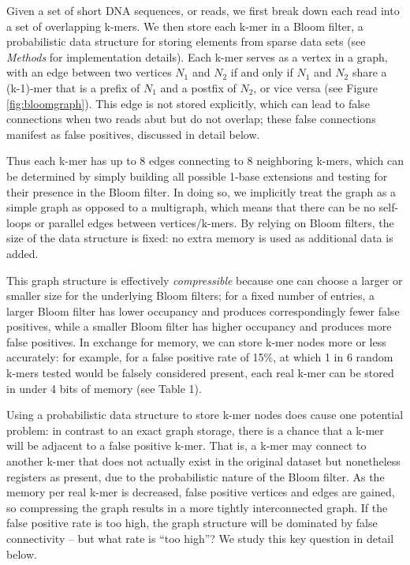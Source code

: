 \documentclass[draft]{pnastwo}
\begin{document}
\begin{article}
Given a set of short DNA sequences, or reads, we first break down each
read into a set of overlapping k-mers.  We then store each k-mer in a
Bloom filter, a probabilistic data structure for storing elements from
sparse data sets (see \emph{Methods} for implementation details).
Each k-mer serves as a vertex in a graph, with an edge between two
vertices $N_1$ and $N_2$ if and only if $N_1$ and $N_2$ share a
(k-1)-mer that is a prefix of $N_1$ and a postfix of $N_2$, or vice
versa (see Figure \ref{fig:bloomgraph}).  This edge is not stored
explicitly, which can lead to false connections when two reads abut
but do not overlap; these false connections manifest as false positives,
discussed in detail below.

Thus each k-mer has up to 8 edges connecting to 8 neighboring k-mers,
which can be determined by simply building all possible 1-base
extensions and testing for their presence in the Bloom filter.  In
doing so, we implicitly treat the graph as a simple graph as opposed
to a multigraph, which means that there can be no self-loops or
parallel edges between vertices/k-mers.  By relying on Bloom filters,
the size of the data structure is fixed: no extra memory is used as
additional data is added.

This graph structure is effectively {\em compressible} because one can
choose a larger or smaller size for the underlying Bloom filters; for
a fixed number of entries, a larger Bloom filter has lower occupancy
and produces correspondingly fewer false positives, while a smaller
Bloom filter has higher occupancy and produces more false
positives. In exchange for memory, we can store k-mer nodes more or
less accurately: for example, for a false positive rate of 15\%, at
which 1 in 6 random k-mers tested would be falsely considered present,
each real k-mer can be stored in under 4 bits of memory (see
Table 1).

Using a probabilistic data structure to store k-mer nodes does cause
one potential problem: in contrast to an exact graph storage, there is
a chance that a k-mer will be adjacent to a false positive k-mer.
That is, a k-mer may connect to another k-mer that does not actually
exist in the original dataset but nonetheless registers as present,
due to the probabilistic nature of the Bloom filter.  As the memory
per real k-mer is decreased, false positive vertices and edges are
gained, so compressing the graph results in a more tightly
interconnected graph.  If the false positive rate is too high, the
graph structure will be dominated by false connectivity -- but what
rate is ``too high''?  We study this key question in detail below.


\end{article}
\end{document}
